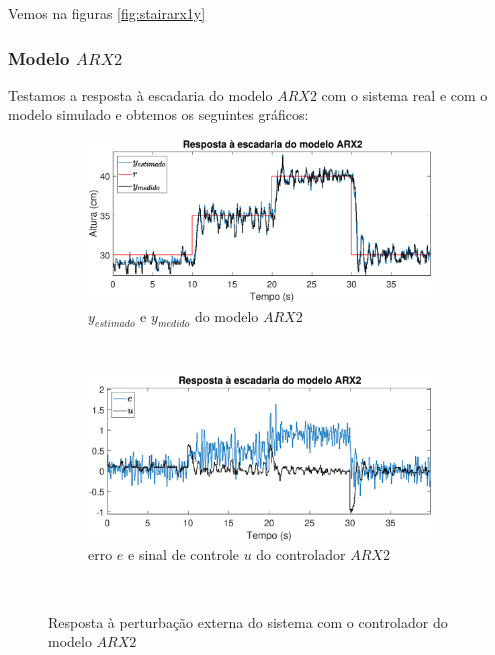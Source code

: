 Vemos na figuras \ref{fig:stairarx1y}

\subsubsection{Modelo $ARX2$}
Testamos a resposta à escadaria do modelo $ARX2$ com o sistema real e com o modelo simulado e obtemos os seguintes gráficos:

\begin{figure}[htb]
	\centering
	\begin{subfigure}[t]{0.48\textwidth}
		\includegraphics[width=1\linewidth]{stairrarx2y}
		\caption[$y_{estimado}$ e $y_{medido}$ do modelo $ARX2$]{$y_{estimado}$ e $y_{medido}$ do modelo $ARX2$}
		\label{fig:stairrarx2y}
	\end{subfigure}
	~ %
	\begin{subfigure}[t]{0.48\textwidth}
		\includegraphics[width=1\linewidth]{stairrarx2e}
		\caption[erro $e$ e sinal de controle $u$ do controlador $ARX2$]{erro $e$ e sinal de controle $u$ do controlador $ARX2$}
		\label{fig:stairrarx2e}
	\end{subfigure}
	~ %
	
	\caption{Resposta à perturbação externa do sistema com o controlador do modelo $ARX2$}\label{fig:stairrarx2}
\end{figure}

